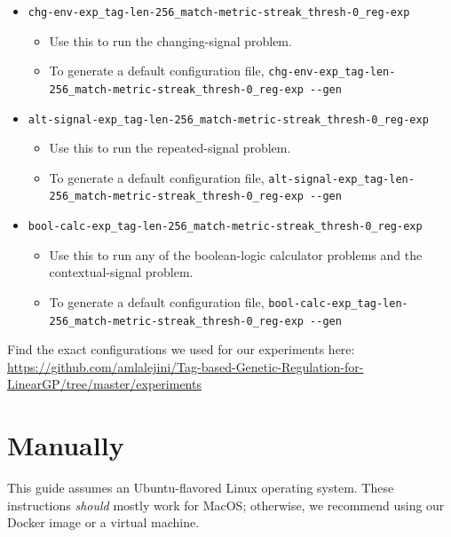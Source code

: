 \documentclass[
]{book}
\providecommand{\tightlist}{%
  \setlength{\itemsep}{0pt}\setlength{\parskip}{0pt}}
\begin{document}
\begin{itemize}
\tightlist
\item
  \texttt{chg-env-exp\_tag-len-256\_match-metric-streak\_thresh-0\_reg-exp}

  \begin{itemize}
  \tightlist
  \item
    Use this to run the changing-signal problem.
  \item
    To generate a default configuration file, \texttt{chg-env-exp\_tag-len-256\_match-metric-streak\_thresh-0\_reg-exp\ -\/-gen}
  \end{itemize}
\item
  \texttt{alt-signal-exp\_tag-len-256\_match-metric-streak\_thresh-0\_reg-exp}

  \begin{itemize}
  \tightlist
  \item
    Use this to run the repeated-signal problem.
  \item
    To generate a default configuration file, \texttt{alt-signal-exp\_tag-len-256\_match-metric-streak\_thresh-0\_reg-exp\ -\/-gen}
  \end{itemize}
\item
  \texttt{bool-calc-exp\_tag-len-256\_match-metric-streak\_thresh-0\_reg-exp}

  \begin{itemize}
  \tightlist
  \item
    Use this to run any of the boolean-logic calculator problems and the contextual-signal problem.
  \item
    To generate a default configuration file, \texttt{bool-calc-exp\_tag-len-256\_match-metric-streak\_thresh-0\_reg-exp\ -\/-gen}
  \end{itemize}
\end{itemize}

Find the exact configurations we used for our experiments here: \url{https://github.com/amlalejini/Tag-based-Genetic-Regulation-for-LinearGP/tree/master/experiments}

\hypertarget{manually}{%
\section{Manually}\label{manually}}

This guide assumes an Ubuntu-flavored Linux operating system. These instructions \emph{should} mostly work for MacOS; otherwise, we recommend using our Docker image or a virtual machine.
\end{document}
